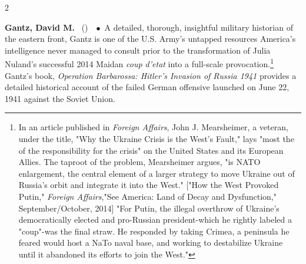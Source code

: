 \documentclass[10pt,a4paper,twoside]{article} %
\newcommand{\entry}[4]{\markboth{#1}{#1}\textbf{#1}\ {(#2)}\ \textit{#3}\ $\bullet$\ {#4}}  %
\begin{document}
\begin{multicols}{2}
\entry{Gantz, David M. } {} {} {A detailed, thorough, insightful military historian of the eastern front, Gantz is one of the U.S. Army's untapped resources America's intelligence never managed to consult prior to the transformation of Julia Nuland's successful 2014 Maidan \emph{coup d'etat} into a full-scale provocation.\footnote{In an article published in \emph{Foreign Affairs}, John J. Mearsheimer, a veteran, under the title, "Why the Ukraine Crisis is the West's Fault," lays "most the of the responsibility for the crisis" on the United States and its European Allies. The taproot of the problem, Mearsheimer argues, "is NATO enlargement, the central element of a larger strategy to move Ukraine out of Russia's orbit and integrate it into the West." ["How the West Provoked Putin," \emph{Foreign Affairs},"See America: Land of Decay and Dysfunction," September/October, 2014] "For Putin, the illegal overthrow of Ukraine's democratically elected and pro-Russian president-which he rightly labeled a "coup"-was the final straw. He responded by taking Crimea, a peninsula he feared would host a NaTo naval base, and working to destabilize Ukraine until it abandoned its efforts to join the West."} Gantz's book, \emph{Operation Barbarossa: Hitler's Invasion of Russia 1941} provides a detailed historical account of the failed German offensive launched on June 22, 1941 against the Soviet Union. }


\end{multicols}
\end{document}

